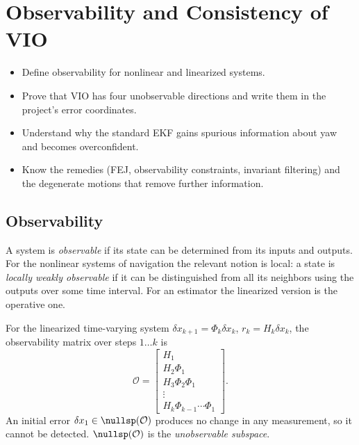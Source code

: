 \chapter{Observability and Consistency of VIO}
\label{ch:observability}

\begin{objectives}
\begin{itemize}
  \item Define observability for nonlinear and linearized systems.
  \item Prove that VIO has four unobservable directions and write them in the project's error coordinates.
  \item Understand why the standard EKF gains spurious information about yaw and becomes overconfident.
  \item Know the remedies (FEJ, observability constraints, invariant filtering) and the degenerate motions that remove
        further information.
\end{itemize}
\end{objectives}

\section{Observability}

A system is \emph{observable} if its state can be determined from its inputs and outputs. For the nonlinear systems of navigation
the relevant notion is local: a state is \emph{locally weakly observable} if it can be distinguished from all its neighbors
using the outputs over some time interval. For an estimator the linearized version is the operative one.

\begin{definition}
For the linearized time-varying system $\delta x_{k+1} = \Phi_k\delta x_k$, $r_k = H_k\delta x_k$, the observability matrix over steps $1\dots k$ is
\begin{equation}
  \mathcal{O} = \begin{bmatrix} H_1 \\ H_2\Phi_1 \\ H_3\Phi_2\Phi_1 \\ \vdots \\ H_k\Phi_{k-1}\cdots\Phi_1 \end{bmatrix}.
\end{equation}
An initial error $\delta x_1 \in \nullsp(\mathcal{O})$ produces no change in any measurement, so it cannot be detected.
$\nullsp(\mathcal{O})$ is the \emph{unobservable subspace}.
\end{definition}

